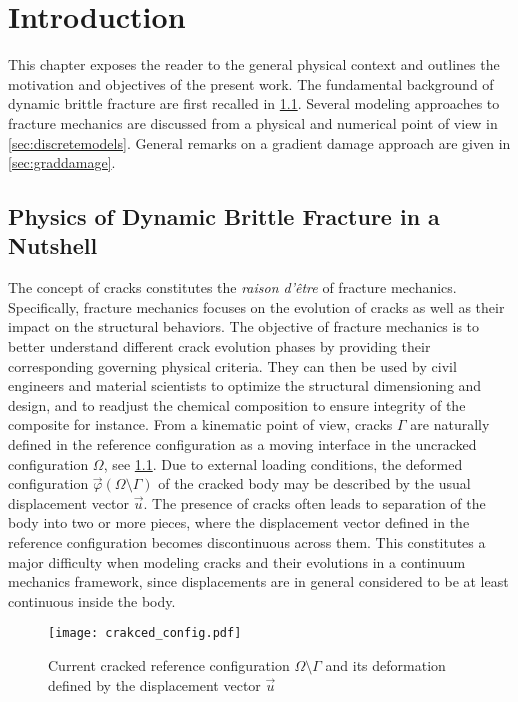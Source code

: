 \chapter{Introduction} \label{chap:introduction}
\minitoc

This chapter exposes the reader to the general physical context and outlines the motivation and objectives of the present work. The fundamental background of dynamic brittle fracture are first recalled in \cref{sec:dynafrac}. Several modeling approaches to fracture mechanics are discussed from a physical and numerical point of view in \cref{sec:discretemodels}. General remarks on a gradient damage approach are given in \cref{sec:graddamage}.

\section{Physics of Dynamic Brittle Fracture in a Nutshell} \label{sec:dynafrac}
The concept of cracks constitutes the \emph{raison d'être} of fracture mechanics. Specifically, fracture mechanics focuses on the evolution of cracks as well as their impact on the structural behaviors. The objective of fracture mechanics is to better understand different crack evolution phases by providing their corresponding governing physical criteria. They can then be used by civil engineers and material scientists to optimize the structural dimensioning and design, and to readjust the chemical composition to ensure integrity of the composite for instance. From a kinematic point of view, cracks $\Gamma$ are naturally defined in the reference configuration as a moving interface in the uncracked configuration $\Omega$, see \cref{fig:crackedconfig}. Due to external loading conditions, the deformed configuration $\vec{\varphi}(\Omega\setminus\Gamma)$ of the cracked body may be described by the usual displacement vector $\vec{u}$. The presence of cracks often leads to separation of the body into two or more pieces, where the displacement vector defined in the reference configuration becomes discontinuous across them. This constitutes a major difficulty when modeling cracks and their evolutions in a continuum mechanics framework, since displacements are in general considered to be at least continuous inside the body.
\begin{figure}[htbp]
\centering
\texttt{[image: crakced\_config.pdf]}
\caption{Current cracked reference configuration $\Omega\setminus\Gamma$ and  its deformation defined by the displacement vector $\vec{u}$} \label{fig:crackedconfig}
\end{figure}

